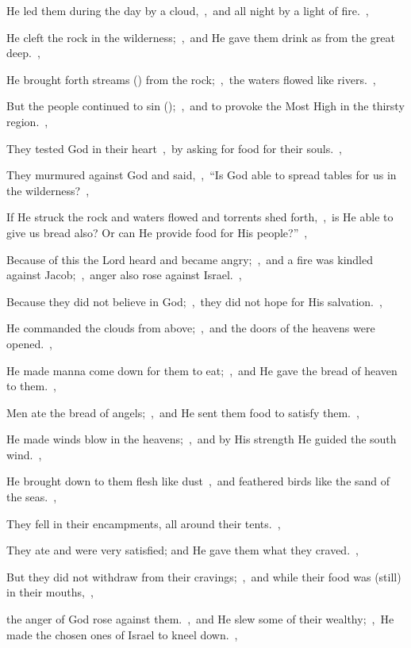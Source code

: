\documentclass[12pt,twoside,a5paper]{article}
\begin{document}
\begin{halfparskip}
  He led them during the day by a cloud,~\sep\ and all night by a light of fire.~\sep

  He cleft the rock in the wilderness;~\sep\ and He gave them drink as from the great deep.~\sep

  He brought forth streams () from the rock;~\sep\ the waters flowed like rivers.~\sep

  But the people continued to sin ();~\sep\ and to provoke the Most High in the thirsty region.~\sep

  They tested God in their heart~\sep\ by asking for food for their souls.~\sep

  They murmured against God and said,~\sep\ ``Is God able to spread tables for us in the wilderness?~\sep

  If He struck the rock and waters flowed and torrents shed forth,~\sep\ is He able to give us bread also? Or can He provide food for His people?''~\sep

  Because of this the Lord heard and became angry;~\sep\ and a fire was kindled against Jacob;~\sep\ anger also rose against Israel.~\sep

  Because they did not believe in God;~\sep\ they did not hope for His salvation.~\sep

   He commanded the clouds from above;~\sep\ and the doors of the heavens were opened.~\sep

  He made manna come down for them to eat;~\sep\ and He gave the bread of heaven to them.~\sep

  Men ate the bread of angels;~\sep\ and He sent them food to satisfy them.~\sep

  He made winds blow in the heavens;~\sep\ and by His strength He guided the south wind.~\sep

  He brought down to them flesh like dust~\sep\ and feathered birds like the sand of the seas.~\sep

  They fell in their encampments, all around their tents.~\sep

  They ate and were very satisfied; and He gave them what they craved.~\sep

  But they did not withdraw from their cravings;~\sep\ and while their food was (still) in their mouths,~\sep

  the anger of God rose against them.~\sep\ and He slew some of their wealthy;~\sep\ He made the chosen ones of Israel to kneel down.~\sep


\end{halfparskip}
\end{document}
